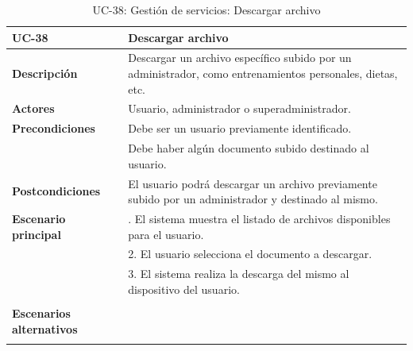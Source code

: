 \begin{table}[H]
  \begin{center}
    \begin{tabularx}{16.4cm}{|l|X|}
      \hline
      \textbf{UC-38} & \textbf{Descargar archivo}\\
      \hline
      \textbf{Descripción} & Descargar un archivo específico subido por un administrador, como entrenamientos personales, dietas, etc. \\
      \hline
      \textbf{Actores} & Usuario, administrador o superadministrador.\\
      \hline
      \textbf{Precondiciones} & Debe ser un usuario previamente identificado.\\
      & Debe haber algún documento subido destinado al usuario.\\
      \hline
      \textbf{Postcondiciones} & El usuario podrá descargar un archivo previamente subido por un administrador y destinado al mismo.\\
      \hline
      \textbf{Escenario principal} & \smallskip 1. El sistema muestra el listado de archivos disponibles para el usuario.\\
      & 2. El usuario selecciona el documento a descargar.\\
      & 3. El sistema realiza la descarga del mismo al dispositivo del usuario.\\
      & \\
      \hline
      \textbf{Escenarios alternativos} & \\
      & \\
      \hline
    \end{tabularx}
    \caption{UC-38: Gestión de servicios: Descargar archivo}
    \label{tab:CU-descargar-archivo}

  \end{center}
\end{table}


